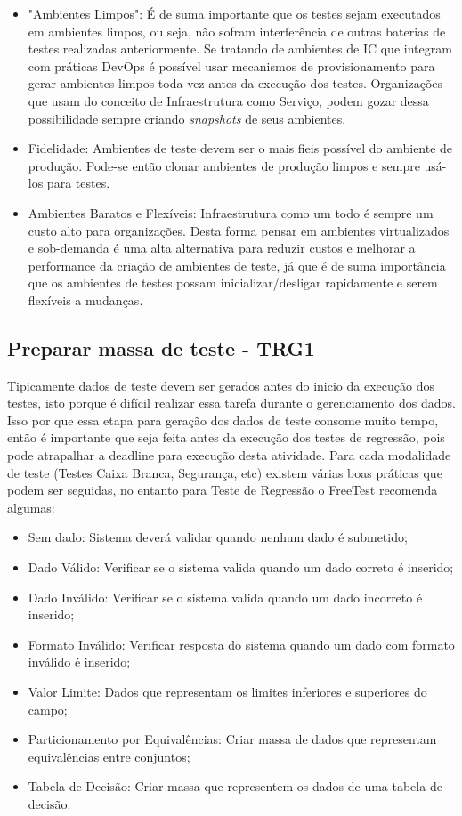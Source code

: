 \begin{itemize}
	\item "Ambientes Limpos": É de suma importante que os testes sejam executados em ambientes limpos, ou seja, não sofram interferência de outras baterias de testes realizadas anteriormente. Se tratando de ambientes de IC que integram com práticas DevOps é possível usar mecanismos de provisionamento para gerar ambientes limpos toda vez antes da execução dos testes. Organizações que usam do conceito de Infraestrutura como Serviço, podem gozar dessa possibilidade sempre criando \textit{snapshots} de seus ambientes.
	\item Fidelidade: Ambientes de teste devem ser o mais fieis possível do ambiente de produção. Pode-se então clonar ambientes de produção limpos e sempre usá-los para testes.
	\item Ambientes Baratos e Flexíveis: Infraestrutura como um todo é sempre um custo alto para organizações. Desta forma pensar em ambientes virtualizados e sob-demanda é uma alta alternativa para reduzir custos e melhorar a performance da criação de ambientes de teste, já que é de suma importância que os ambientes de testes possam inicializar/desligar rapidamente e serem flexíveis a mudanças.
\end{itemize}

\subsection{Preparar massa de teste - TRG1}

Tipicamente dados de teste devem ser gerados antes do inicio da execução dos testes, isto porque é difícil realizar essa tarefa durante o gerenciamento dos dados. Isso por que essa etapa para geração dos dados de teste consome muito tempo, então é importante que seja feita antes da execução dos testes de regressão, pois pode atrapalhar a deadline para execução desta atividade. Para cada modalidade de teste (Testes Caixa Branca, Segurança, etc) existem várias boas práticas que podem ser seguidas, no entanto para Teste de Regressão o FreeTest recomenda algumas:

\begin{itemize}
    \item Sem dado: Sistema deverá validar quando nenhum dado é submetido;
    \item Dado Válido: Verificar se o sistema valida quando um dado correto é inserido;
    \item Dado Inválido: Verificar se o sistema valida quando um dado incorreto é inserido;
    \item Formato Inválido: Verificar resposta do sistema quando um dado com formato inválido é inserido;
    \item Valor Limite: Dados que representam os limites inferiores e superiores do campo;
    \item Particionamento por Equivalências: Criar massa de dados que representam equivalências entre conjuntos;
    \item Tabela de Decisão: Criar massa que representem os dados de uma tabela de decisão.
\end{itemize}

